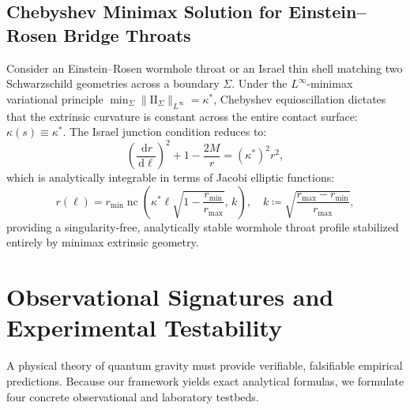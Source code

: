 \documentclass[11pt,a4paper,reqno]{amsart}
\theoremstyle{definition}
\numberwithin{equation}{section}
\newcommand{\II}{\mathrm{I\!I}}
\newcommand{\dif}{\,\mathrm{d}}
\begin{document}
\subsection{Chebyshev Minimax Solution for Einstein--Rosen Bridge Throats}
Consider an Einstein--Rosen wormhole throat or an Israel thin shell matching two Schwarzschild geometries across a boundary $\Sigma$. Under the $L^\infty$-minimax variational principle $\min_\Sigma \|\II_\Sigma\|_{L^\infty} = \kappa^*$, Chebyshev equioscillation dictates that the extrinsic curvature is constant across the entire contact surface: $\kappa(s) \equiv \kappa^*$. The Israel junction condition reduces to:
\begin{equation}
    \left( \frac{\dif r}{\dif \ell} \right)^2 + 1 - \frac{2 M}{r} = (\kappa^*)^2 r^2,
\end{equation}
which is analytically integrable in terms of Jacobi elliptic functions:
\begin{equation}
    \label{eq:jacobi_throat_solution}
    r(\ell) = r_{\min} \operatorname{nc}\left( \kappa^* \ell \sqrt{1 - \frac{r_{\min}}{r_{\max}}}, \, k \right), \quad k \coloneqq \sqrt{\frac{r_{\max} - r_{\min}}{r_{\max}}},
\end{equation}
providing a singularity-free, analytically stable wormhole throat profile stabilized entirely by minimax extrinsic geometry.

\section{Observational Signatures and Experimental Testability}
\label{sec:experimental}

A physical theory of quantum gravity must provide verifiable, falsifiable empirical predictions. Because our framework yields exact analytical formulas, we formulate four concrete observational and laboratory testbeds.
\end{document}
